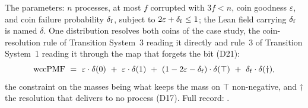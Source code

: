 \begin{definition}
  \label{def:aba-params}
  \leanok
  The parameters: $n$ processes, at most $f$ corrupted with $3f < n$, coin goodness $\varepsilon$, and coin failure probability $\delta_{\mathrm{f}}$, subject to $2\varepsilon + \delta_{\mathrm{f}} \le 1$; the Lean field carrying $\delta_{\mathrm{f}}$ is named $\delta$.
  One distribution resolves both coins of the case study, the coin-resolution rule  of Transition System~3 reading it directly and rule~3 of Transition System~1 reading it through the map that forgets the bit (D21):
  \[
    \mathrm{wccPMF} \ =\ \varepsilon \cdot \delta(0) \ +\
      \varepsilon \cdot \delta(1) \ +\
      (1 - 2\varepsilon - \failmass) \cdot \delta(\top) \ +\
      \failmass \cdot \delta(\dagger),
  \]
  the constraint on the masses being what keeps the mass on $\top$ non-negative, and $\dagger$ the resolution that delivers to no process (D17).
  Full record: .
\end{definition}
